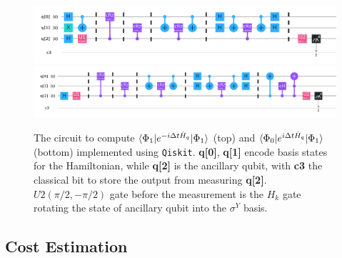 \documentclass[journal=jctcce,manuscript=article]{achemso}
\begin{document}
\begin{figure}[h!]
  \centering
  \includegraphics[width=6.5in]{figs/phi1_cir4y.pdf}
  \includegraphics[width=6.5in]{figs/phi0+e1_cir_y.pdf}
  \caption{The circuit to compute $\braket{\Phi_1  | e^{-i \Delta t \hat{H}_q}  |  \Phi_1}$ (top) and $\braket{\Phi_0  | e^{i \Delta t \hat{H}_q}  |  \Phi_1}$ (bottom) implemented using \texttt{Qiskit}\cite{Qiskit}. \textbf{q[0]}, \textbf{q[1] }encode basis states for the Hamiltonian, while \textbf{q[2]} is the ancillary qubit, with \textbf{c3} the classical bit to store the output from measuring \textbf{q[2]}. $U2(\pi/2, -\pi/2)$ gate before the measurement is the $H_k$ gate rotating the state of ancillary qubit into the $\sigma^Y$ basis.  }
\label{h2_cir}
\end{figure}

\subsection{Cost Estimation}
\end{document}
